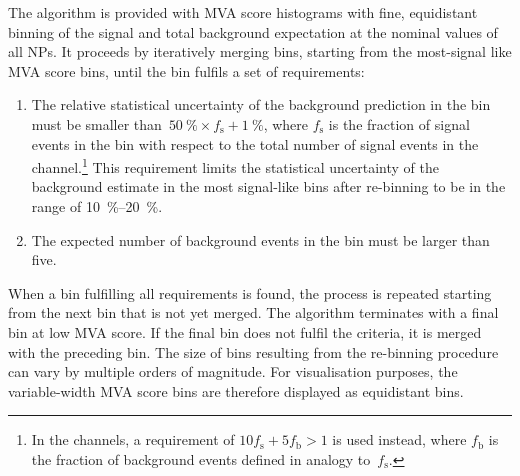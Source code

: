 The algorithm is provided with MVA score histograms with fine, equidistant
binning of the signal and total background expectation at the nominal values of
all NPs. It proceeds by iteratively merging bins, starting from the most-signal
like MVA score bins, until the bin fulfils a set of requirements:
\begin{enumerate}

\item The relative statistical uncertainty of the background prediction in the
  bin must be smaller
  than~\mbox{$\SI{50}{\percent} \times f_\text{s} + \SI{1}{\percent}$}, where
  $f_\text{s}$ is the fraction of signal events in the bin with respect to the
  total number of signal events in the channel.\footnote{In the \lephad
    channels, a requirement of $10 f_{\text{s}} + 5 f_{\text{b}} > 1$ is used
    instead, where $f_{\text{b}}$ is the fraction of background events defined
    in analogy to~$f_{\text{s}}$.} This requirement limits the statistical
  uncertainty of the background estimate in the most signal-like bins after
  re-binning to be in the range of \SIrange{10}{20}{\percent}.

\item The expected number of background events in the bin must be larger than
  five.

\end{enumerate}
When a bin fulfilling all requirements is found, the process is repeated
starting from the next bin that is not yet merged. The algorithm terminates with
a final bin at low MVA score. If the final bin does not fulfil the criteria, it
is merged with the preceding bin.
The size of bins resulting from the re-binning procedure can vary by multiple
orders of magnitude. For visualisation purposes, the variable-width MVA score
bins are therefore displayed as equidistant bins.




